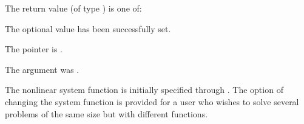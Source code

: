 {
  The return value  (of type ) is one of:
  \begin{args}
  \item[\Id{KIN\_SUCCESS}] 
    The optional value has been successfully set.
  \item[\Id{KIN\_MEM\_NULL}]
    The  pointer is .
  \item[\Id{KIN\_ILL\_INPUT}]
    The argument  was .
  \end{args}
}
{
  The nonlinear system function is initially specified through .
  The option of changing the system function is provided for a user who wishes 
  to solve several problems of the same size but with different functions.
}

